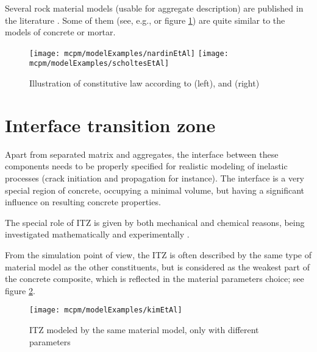 Several rock material models (usable for aggregate description) are published in the literature
\cite{
	ErgenzingerSeifriedEberhard2012a,%
	HuangLecampionDetournay2013a,%
	ChoMartinSego2007a,%
	NardinSchrefler2004a,%
	PotyondyCundall2004a,%
	RojekOnateCarlosKargl2011a,%
	ScholtesDonze2013a,%
	ScholtesDonze2012a,%
	TangXuaKoucLindqvistcLiu2001a,%
	WangTonon2009a%
}.
Some of them (see, e.g.,
\cite {
	NardinSchrefler2004a,%
	ScholtesDonze2013a,%
	ScholtesDonze2012a%
} or figure \ref{figMCPMRockModels}) are quite similar to the models of concrete or mortar.
\begin{figure}[ht]
	\centering
	\texttt{[image: mcpm/modelExamples/nardinEtAl]}
	\texttt{[image: mcpm/modelExamples/scholtesEtAl]}
	\caption[Illustration of constitutive law]{Illustration of constitutive law according to
		\cite{NardinSchrefler2004a} (left),
		and
		\cite{ScholtesDonze2013a} (right)
	}
	\label{figMCPMRockModels}
\end{figure}

\section{Interface transition zone}
Apart from separated matrix and aggregates, the interface between these components needs to be properly specified for realistic modeling of inelastic processes (crack initiation and propagation for instance).
The interface is a very special region of concrete, occupying a minimal volume, but having a significant influence on resulting concrete properties.

The special role of ITZ is given by both mechanical and chemical reasons, being investigated mathematically and experimentally
\cite{%
	ErdemDawsonThom2012a,%
	GiaccioZerbino1998a,%
	GiaccioZerbinoPonceBatic2008a,%
	RaoPrasad2002a%
}.

From the simulation point of view, the ITZ is often described by the same type of material model as the other constituents, but is considered as the weakest part of the concrete composite, which is reflected in the material parameters choice; see figure \ref{figMCPMItzModeledSameAsMortar}.
\begin{figure}[ht]
	\centering
	\texttt{[image: mcpm/modelExamples/kimEtAl]}
	\caption[ITZ modeled by the same material model]{ITZ modeled by the same material model, only with different parameters
		\cite{KimAlrub2011a}
	}
	\label{figMCPMItzModeledSameAsMortar}
\end{figure}

